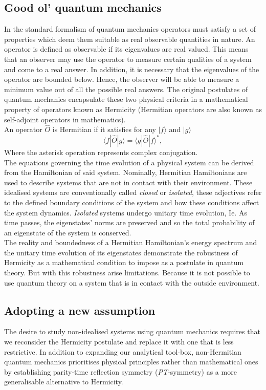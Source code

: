 \documentclass[10pt, a4paper, singlespacing, headsepline]{article}
\newcommand\PT{\textit{PT}}
\begin{document}
\subsection{Good ol' quantum mechanics}
In the standard formalism of quantum mechanics operators must satisfy a set of properties which deem them suitable as real observable quantities in nature.
An operator is defined as observable if its eigenvalues are real valued. This means that an observer may use the operator to measure certain qualities of a system and come to a real answer. In addition, it is  necessary that the eigenvalues of the operator are bounded below. Hence, the observer will be able to measure a minimum value out of all the possible real answers. 
The original postulates of quantum mechanics encapsulate these two physical criteria in a mathematical property of operators known as Hermicity (Hermitian operators are also known as self-adjoint operators in mathematics).\\
An operator $\hat{O}$ is Hermitian if it satisfies for any $|f \rangle$ and $|g\rangle$
\begin{equation} \label{eq:1}
\langle f|\widehat{O}|g\rangle = \langle g|\widehat{O}|f \rangle^{*},
\end{equation}  
Where the asterisk operation represents complex conjugation.\\
The equations governing the time evolution of a physical system can be derived from the Hamiltonian of said system\cite{BenderPT}. Nominally, Hermitian Hamiltonians are used to describe systems that are not in contact with their environment. These idealised systems are conventionally called \textit{closed} or \textit{isolated}, these adjectives refer to the defined boundary conditions of the system and how these conditions affect the system dynamics. \textit{Isolated} systems undergo unitary time evolution, Ie. As time passes, the eigenstates' norms are preserved and so the total probability of an eigenstate of the system is conserved. 
\\The reality and boundedness of a Hermitian Hamiltonian's energy spectrum and the unitary time evolution of its eigenstates demonstrate the robustness of Hermicity as a mathematical condition to impose as a postulate in quantum theory.
But with this robustness arise limitations. Because it is not possible to use quantum theory on a system that is in contact with the outside environment.

\subsection{Adopting a new assumption}
The desire to study non-idealised systems using quantum mechanics requires that we reconsider the Hermicity postulate and replace it with one that is less restrictive.
In addition to expanding our analytical tool-box, non-Hermitian quantum mechanics prioritises physical principles rather than mathematical ones by establishing parity-time reflection symmetry (\PT-symmetry) as a more generalisable alternative to Hermicity.
 
\end{document}
